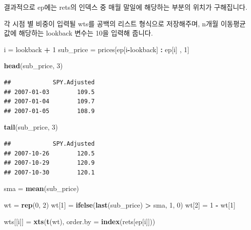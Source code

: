 \documentclass[12pt,]{book}
\newenvironment{Shaded}{\begin{snugshade}}{\end{snugshade}}
\newcommand{\DataTypeTok}[1]{\textcolor[rgb]{0.13,0.29,0.53}{#1}}
\newcommand{\DecValTok}[1]{\textcolor[rgb]{0.00,0.00,0.81}{#1}}
\newcommand{\KeywordTok}[1]{\textcolor[rgb]{0.13,0.29,0.53}{\textbf{#1}}}
\newcommand{\NormalTok}[1]{#1}
\newcommand{\OperatorTok}[1]{\textcolor[rgb]{0.81,0.36,0.00}{\textbf{#1}}}
\newcommand{\StringTok}[1]{\textcolor[rgb]{0.31,0.60,0.02}{#1}}
\begin{document}
결과적으로 ep에는 rets의 인덱스 중 매월 말일에 해당하는 부분의 위치가 구해집니다.

각 시점 별 비중이 입력될 wts를 공백의 리스트 형식으로 저장해주며, n개월 이동평균 값에 해당하는 lookback 변수는 10을 입력해 줍니다.

\begin{Shaded}
\begin{Highlighting}[]
\NormalTok{i =}\StringTok{ }\NormalTok{lookback }\OperatorTok{+}\StringTok{ }\DecValTok{1}
\NormalTok{sub_price =}\StringTok{ }\NormalTok{prices[ep[i}\OperatorTok{-}\NormalTok{lookback] }\OperatorTok{:}\StringTok{ }\NormalTok{ep[i] , }\DecValTok{1}\NormalTok{]}

\KeywordTok{head}\NormalTok{(sub_price, }\DecValTok{3}\NormalTok{)}
\end{Highlighting}
\end{Shaded}

\begin{verbatim}
##            SPY.Adjusted
## 2007-01-03        109.5
## 2007-01-04        109.7
## 2007-01-05        108.9
\end{verbatim}

\begin{Shaded}
\begin{Highlighting}[]
\KeywordTok{tail}\NormalTok{(sub_price, }\DecValTok{3}\NormalTok{)}
\end{Highlighting}
\end{Shaded}

\begin{verbatim}
##            SPY.Adjusted
## 2007-10-26        120.5
## 2007-10-29        120.9
## 2007-10-30        120.1
\end{verbatim}

\begin{Shaded}
\begin{Highlighting}[]
\NormalTok{sma =}\StringTok{ }\KeywordTok{mean}\NormalTok{(sub_price)}

\NormalTok{wt =}\StringTok{ }\KeywordTok{rep}\NormalTok{(}\DecValTok{0}\NormalTok{, }\DecValTok{2}\NormalTok{)}
\NormalTok{wt[}\DecValTok{1}\NormalTok{] =}\StringTok{ }\KeywordTok{ifelse}\NormalTok{(}\KeywordTok{last}\NormalTok{(sub_price) }\OperatorTok{>}\StringTok{ }\NormalTok{sma, }\DecValTok{1}\NormalTok{, }\DecValTok{0}\NormalTok{)}
\NormalTok{wt[}\DecValTok{2}\NormalTok{] =}\StringTok{ }\DecValTok{1} \OperatorTok{-}\StringTok{ }\NormalTok{wt[}\DecValTok{1}\NormalTok{]}

\NormalTok{wts[[i]] =}\StringTok{ }\KeywordTok{xts}\NormalTok{(}\KeywordTok{t}\NormalTok{(wt), }\DataTypeTok{order.by =} \KeywordTok{index}\NormalTok{(rets[ep[i]]))}
\end{Highlighting}
\end{Shaded}
\end{document}
